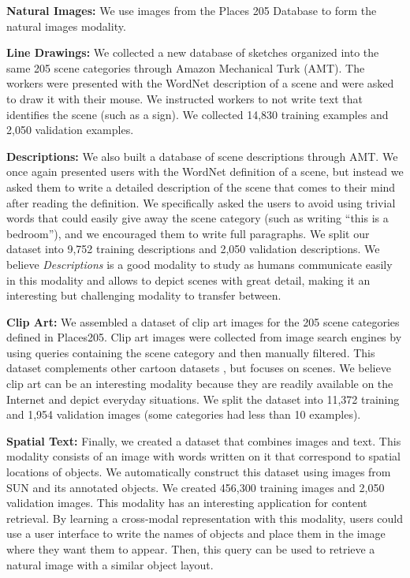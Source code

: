 \documentclass[10pt,journal,compsoc]{IEEEtran}
\begin{document}
	\textbf{Natural Images:}
	We use images from the Places 205 Database \cite{zhou2014learning} to form the natural images modality. 
	
	\textbf{Line Drawings:}
	We collected a new database of sketches organized into the same 205 scene categories through Amazon Mechanical Turk (AMT). The workers were presented with the WordNet description of a scene and were asked to draw it with their mouse. We instructed workers to not write text that identifies the scene (such as a sign). We collected 14,830 training examples and 2,050 validation examples. 
	
	
	\textbf{Descriptions:}
	We also built a database of scene descriptions through AMT. We once again presented users with the WordNet definition of a scene, but instead we asked them to write a detailed description of the scene that comes to their mind after reading the definition. We specifically asked the users to avoid using trivial words that could easily give away the scene category (such as writing ``this is a bedroom''), and we encouraged them to write full paragraphs. %
	We split our dataset into 9,752 training descriptions and 2,050 validation descriptions.
	We believe \textit{Descriptions} is a good modality to study as humans communicate easily in this modality and allows to depict scenes with great detail, making it an interesting but challenging modality to transfer between.
	
	\textbf{Clip Art:}
	We assembled a dataset of clip art images for the 205 scene categories defined in Places205. Clip art images were collected from image search engines by using queries containing the scene category and then manually filtered. This dataset complements other cartoon datasets \cite{zitnick2013bringing}, but focuses on scenes. We believe clip art can be an interesting modality because they are readily available on the Internet and depict everyday situations. We split the dataset into 11,372 training and 1,954 validation images (some categories had less than 10 examples).
	
	\textbf{Spatial Text:} 
	Finally, we created a dataset that combines images and text. This modality consists of an image with words written on it that correspond to spatial locations of objects. We automatically construct this dataset using images from SUN \cite{xiao2010sun} and its annotated objects. We created 456,300 training images and 2,050 validation images. This modality has an interesting application for content retrieval. By learning a cross-modal representation with this modality, users could use a user interface to write the names of objects and place them in the image where they want them to appear. Then, this query can be used to retrieve a natural image with a similar object layout. 
\end{document}
